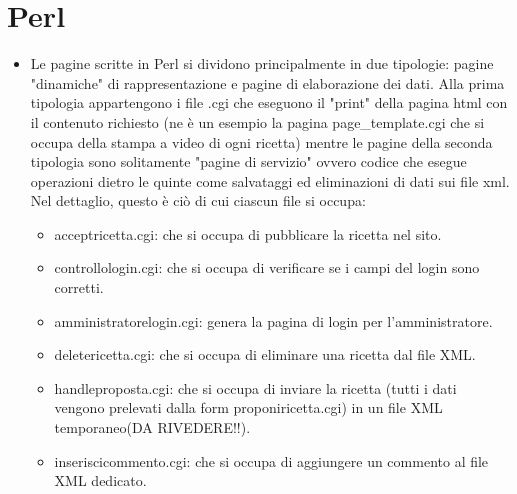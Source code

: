 \documentclass[12pt]{article}
\begin{document}
			\section{Perl}
			\begin{itemize}
				\item Le pagine scritte in Perl si dividono principalmente in due tipologie: pagine "dinamiche" di rappresentazione e pagine di elaborazione dei dati.
				Alla prima tipologia appartengono i file .cgi che eseguono il "print" della pagina html con il contenuto richiesto (ne è un esempio la pagina page_template.cgi che si occupa della stampa a video di ogni ricetta) mentre le pagine della seconda tipologia sono solitamente "pagine di servizio" ovvero codice che esegue operazioni dietro le quinte come salvataggi ed eliminazioni di dati sui file xml. Nel dettaglio, questo è ciò di cui ciascun file si occupa:
				
				\begin{itemize} \item acceptricetta.cgi: che si occupa di pubblicare la ricetta nel sito.
				\end{itemize}
				
				\begin{itemize} \item controllologin.cgi: che si occupa di verificare se i campi del login sono corretti.
				\end{itemize}
				
				\begin{itemize} \item amministratorelogin.cgi: genera la pagina di login per l'amministratore.
				\end{itemize}
				
				\begin{itemize} \item deletericetta.cgi: che si occupa di eliminare una ricetta dal file XML.
				\end{itemize}
				
				\begin{itemize} \item handleproposta.cgi: che si occupa di inviare la ricetta (tutti i dati vengono prelevati dalla form proponiricetta.cgi) in un file XML temporaneo(DA RIVEDERE!!).
				\end{itemize}
				
				\begin{itemize} \item inseriscicommento.cgi: che si occupa di aggiungere un commento al file XML dedicato.
				\end{itemize}
				

\end{itemize}
\end{document}
